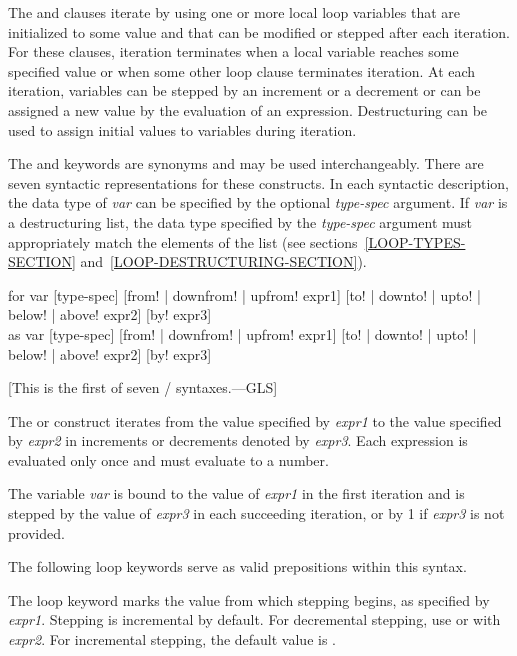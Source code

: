 \begin{new}
The  and  clauses iterate by using one or more local 
loop  variables that are initialized to some value and that 
can be modified or stepped after each iteration.  
For these clauses, iteration terminates when a local
variable reaches some specified value or when some other loop clause
terminates iteration.  At each iteration, variables can be stepped by an
increment or a decrement or can be assigned a new value by 
the evaluation of 
an expression.  Destructuring can be used to assign initial values to 
variables during iteration.

The  and  keywords are synonyms and may be used
interchangeably.  There are
seven syntactic representations for these constructs.
In each syntactic description, the data type of
{\it var\/} can be specified by the optional {\it type-spec\/}
argument.  If {\it var\/} is a destructuring list, the data type
specified by the {\it type-spec\/} argument must appropriately match
the elements of the list (see sections~\ref{LOOP-TYPES-SECTION}
and~\ref{LOOP-DESTRUCTURING-SECTION}).

\begin{defloop}
for var [type-spec] [{\!from! | \!downfrom! | \!upfrom!} expr1]
                    [{\!to! | \!downto! | \!upto! | \!below! | \!above!} expr2]
                    [\!by! expr3] \\
as var [type-spec] [{\!from! | \!downfrom! | \!upfrom!} expr1]
                   [{\!to! | \!downto! | \!upto! | \!below! | \!above!} expr2]
                   [\!by! expr3]

[This is the first of seven / syntaxes.---GLS]

The  or  construct iterates from the value specified by
{\it expr1\/} to the value specified by {\it expr2\/} in increments or
decrements denoted by {\it expr3}. Each
expression is evaluated only once and must evaluate to a number.  

The variable {\it var\/} is bound to the value of 
{\it expr1\/} in the first iteration and is stepped
by the value of {\it expr3\/} in each succeeding iteration,
or by 1 if {\it expr3\/} is not provided.  

The following loop keywords serve as valid prepositions within this 
syntax.

\begin{flushdesc}
\item[\cd{from}]
The loop keyword  marks the value from which
stepping begins, as specified by {\it expr1}.  
Stepping is incremental by default.  For
decremental stepping, use 
or  with {\it expr2}.  For incremental
stepping, the default  value is .


\end{flushdesc}
\end{defloop}
\end{new}
